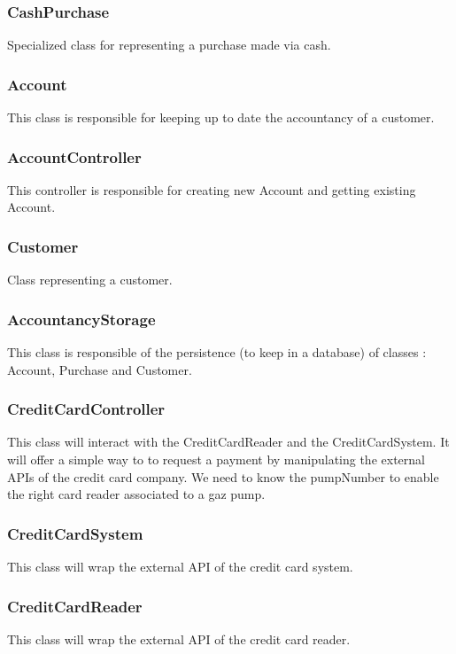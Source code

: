 \documentclass[11pt, a4paper]{article}
\begin{document}
\subsubsection*{CashPurchase}
Specialized class for representing a purchase made via cash.

\subsubsection*{Account}
This class is responsible for keeping up to date the accountancy of a customer.

\subsubsection*{AccountController}
This controller is responsible for creating new Account and getting existing Account.

\subsubsection*{Customer}
Class representing a customer.

\subsubsection*{AccountancyStorage}
This class is responsible of the persistence (to keep in a database) of classes : Account, Purchase and Customer.

\subsubsection*{CreditCardController}
This class will interact with the CreditCardReader and the CreditCardSystem. It will offer a simple way to to request a payment by manipulating the external APIs of the credit card company. We need to know the pumpNumber to enable the right card reader associated to a gaz pump.

\subsubsection*{CreditCardSystem}
This class will wrap the external API of the credit card system.

\subsubsection*{CreditCardReader}
This class will wrap the external API of the credit card reader.
\end{document}
